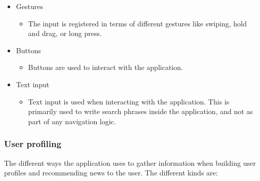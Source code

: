 \begin{itemize}
	\item Gestures
	\begin{itemize}
		\item The input is registered in terms of different gestures like swiping, hold and drag, or long press.
	\end{itemize}

	\item Buttons
	\begin{itemize}
		\item Buttons are used to interact with the application.
	\end{itemize}

	\item Text input
	\begin{itemize}
		\item Text input is used when interacting with the application. This is primarily used to write search phrases inside the application, and not as part of any navigation logic.
	\end{itemize}
\end{itemize}

\subsubsection{User profiling}
The different ways the application uses to gather information when building user profiles and recommending news to the user. The different kinds are:

